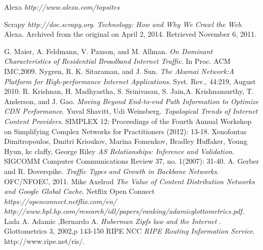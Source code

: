 \begin{thebibliography}{}
Alexa
\textit{http://www.alexa.com/topsites}

Scrapy
\textit{http://doc.scrapy.org}.
\textit{Technology: How and Why We Crawl the Web}. 
Alexa. Archived from the original on April 2, 2014. Retrieved November 6, 2011.

G. Maier, A. Feldmann, V. Paxson, and M. Allman.
\textit{On Dominant Characteristics of Residential Broadband Internet Traffic}.
In Proc. ACM IMC,2009.
Nygren, R. K. Sitaraman, and J. Sun. 
\textit{The Akamai Network:A Platform for High-performance Internet Applications}.
Syst. Rev., 44:219, August 2010.
R. Krishnan, H. Madhyastha, S. Srinivasan, S. Jain,A. Krishnamurthy, T.
Anderson, and J. Gao. 
\textit{Moving Beyond End-to-end Path Information to Optimize CDN Performance}.
Yuval Shavitt, Udi Weinsberg.
\textit{Topological Trends of Internet Content Providers}.
SIMPLEX 12: Proceedings of the Fourth Annual Workshop on
Simplifying Complex Networks for Practitioners (2012): 13-18.
Xenofontas Dimitropoulos, Dmitri Krioukov, Marina Fomenkov, Bradley
Huffaker, Young Hyun, kc claffy, George Riley 
\textit{AS Relationships: Inference and Validation}.
SIGCOMM Computer Communications Review 37, no. 1(2007): 31-40.
A. Gerber and R. Doverspike.
\textit{Traffic Types and Growth in Backbone Networks}.
OFC/NFOEC, 2011.
Mike Axelrod
\textit{The Value of Content Distribution Networks and Google Global Cache}.
Netflix Open Connect
\textit{https://openconnect.netflix.com/en/}
\textit{http://www.hpl.hp.com/research/idl/papers/ranking/adamicglottometrics.pdf.}
Lada A. Adamic ,Bernardo A. 
\textit{Huberman Zipfs law and the Internet} . 
Glottometrics 3, 2002,p 143-150
RIPE NCC
\textit{RIPE Routing Information Service}.
http://www.ripe.net/ris/.


\end{thebibliography}